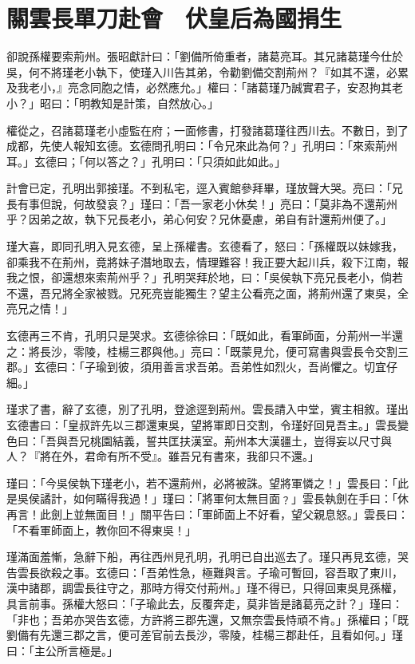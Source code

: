 
\chapter{關雲長單刀赴會　伏皇后為國捐生}

卻說孫權要索荊州。張昭獻計曰：「劉備所倚重者，諸葛亮耳。其兄諸葛瑾今仕於吳，何不將瑾老小執下，使瑾入川告其弟，令勸劉備交割荊州？『如其不還，必累及我老小，』亮念同胞之情，必然應允。」權曰：「諸葛瑾乃誠實君子，安忍拘其老小？」昭曰：「明教知是計策，自然放心。」

權從之，召諸葛瑾老小虛監在府；一面修書，打發諸葛瑾往西川去。不數日，到了成都，先使人報知玄德。玄德問孔明曰：「令兄來此為何？」孔明曰：「來索荊州耳。」玄德曰；「何以答之？」孔明曰：「只須如此如此。」

計會已定，孔明出郭接瑾。不到私宅，逕入賓館參拜畢，瑾放聲大哭。亮曰：「兄長有事但說，何故發哀？」瑾曰：「吾一家老小休矣！」亮曰：「莫非為不還荊州乎？因弟之故，執下兄長老小，弟心何安？兄休憂慮，弟自有計還荊州便了。」

瑾大喜，即同孔明入見玄德，呈上孫權書。玄德看了，怒曰：「孫權既以妹嫁我，卻乘我不在荊州，竟將妹子潛地取去，情理難容！我正要大起川兵，殺下江南，報我之恨，卻還想來索荊州乎？」孔明哭拜於地，曰：「吳侯執下亮兄長老小，倘若不還，吾兄將全家被戮。兄死亮豈能獨生？望主公看亮之面，將荊州還了東吳，全亮兄之情！」

玄德再三不肯，孔明只是哭求。玄德徐徐曰：「既如此，看軍師面，分荊州一半還之：將長沙，零陵，桂楊三郡與他。」亮曰：「既蒙見允，便可寫書與雲長令交割三郡。」玄德曰：「子瑜到彼，須用善言求吾弟。吾弟性如烈火，吾尚懼之。切宜仔細。」

瑾求了書，辭了玄德，別了孔明，登途逕到荊州。雲長請入中堂，賓主相敘。瑾出玄德書曰：「皇叔許先以三郡還東吳，望將軍即日交割，令瑾好回見吾主。」雲長變色曰：「吾與吾兄桃園結義，誓共匡扶漢室。荊州本大漢疆土，豈得妄以尺寸與人？『將在外，君命有所不受』。雖吾兄有書來，我卻只不還。」

瑾曰：「今吳侯執下瑾老小，若不還荊州，必將被誅。望將軍憐之！」雲長曰：「此是吳侯譎計，如何瞞得我過！」瑾曰：「將軍何太無目面﹖」雲長執劍在手曰：「休再言！此劍上並無面目！」關平告曰：「軍師面上不好看，望父親息怒。」雲長曰：「不看軍師面上，教你回不得東吳！」

瑾滿面羞慚，急辭下船，再往西州見孔明，孔明已自出巡去了。瑾只再見玄德，哭告雲長欲殺之事。玄德曰：「吾弟性急，極難與言。子瑜可暫回，容吾取了東川，漢中諸郡，調雲長往守之，那時方得交付荊州。」瑾不得已，只得回東吳見孫權，具言前事。孫權大怒曰：「子瑜此去，反覆奔走，莫非皆是諸葛亮之計？」瑾曰：「非也；吾弟亦哭告玄德，方許將三郡先還，又無奈雲長恃頑不肯。」孫權曰；「既劉備有先還三郡之言，便可差官前去長沙，零陵，桂楊三郡赴任，且看如何。」瑾曰：「主公所言極是。」

